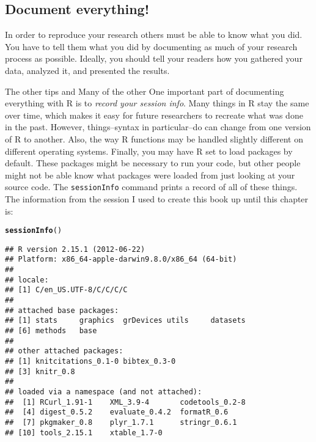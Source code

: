 \documentclass[ChapterTOCs,krantz1]{krantz}\usepackage{graphicx, color}
\makeatletter
\newcommand{\hlfunctioncall}[1]{\textcolor[rgb]{0.501960784313725,0,0.329411764705882}{\textbf{#1}}}%
\newenvironment{kframe}{%
 \def\at@end@of@kframe{}%
 \ifinner\ifhmode%
  \def\at@end@of@kframe{\end{minipage}}%
  \begin{minipage}{\columnwidth}%
 \fi\fi%
 \def\FrameCommand##1{\hskip\@totalleftmargin \hskip-\fboxsep
 \colorbox{shadecolor}{##1}\hskip-\fboxsep
     \hskip-\linewidth \hskip-\@totalleftmargin \hskip\columnwidth}%
 \MakeFramed {\advance\hsize-\width
   \@totalleftmargin\z@ \linewidth\hsize
   \@setminipage}}%
 {\par\unskip\endMakeFramed%
 \at@end@of@kframe}
\newenvironment{knitrout}{}{} %
\makeatother
\begin{document}
\subsection{Document everything!}

In order to reproduce your research others must be able to know what you did. You have to tell them what you did by documenting as much of your research process as possible. Ideally, you should tell your readers how you gathered your data, analyzed it, and presented the results.

The other tips and Many of the other One important part of documenting everything with R is to \emph{record your session info}. Many things in R stay the same over time, which makes it easy for future researchers to recreate what was done in the past. However, things--syntax in particular--do can change from one version of R to another. Also, the way R functions may be handled slightly different on different operating systems. Finally, you may have R set to load packages by default. These packages might be necessary to run your code, but other people might not be able know what packages were loaded from just looking at your source code. The \texttt{sessionInfo} command prints a record of all of these things. The information from the session I used to create this book up until this chapter is:

\begin{knitrout}
\color{fgcolor}\begin{kframe}
\begin{alltt}
\hlfunctioncall{sessionInfo}()
\end{alltt}
\begin{verbatim}
## R version 2.15.1 (2012-06-22)
## Platform: x86_64-apple-darwin9.8.0/x86_64 (64-bit)
## 
## locale:
## [1] C/en_US.UTF-8/C/C/C/C
## 
## attached base packages:
## [1] stats     graphics  grDevices utils     datasets 
## [6] methods   base     
## 
## other attached packages:
## [1] knitcitations_0.1-0 bibtex_0.3-0       
## [3] knitr_0.8          
## 
## loaded via a namespace (and not attached):
##  [1] RCurl_1.91-1    XML_3.9-4       codetools_0.2-8
##  [4] digest_0.5.2    evaluate_0.4.2  formatR_0.6    
##  [7] pkgmaker_0.8    plyr_1.7.1      stringr_0.6.1  
## [10] tools_2.15.1    xtable_1.7-0
\end{verbatim}
\end{kframe}
\end{knitrout}
\end{document}
